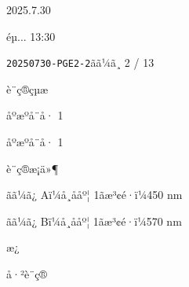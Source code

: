 \documentclass[UTF8,10pt,a4paper,fontset=fandol]{ctexart}
\newcommand{\handwritten}[1]{#1}
\begin{document}
\begin{center}
\begin{center}

\handwritten{2025.7.30}

\handwritten{éµ... 13:30}

\newpage

\noindent\texttt{20250730-PGE2-2}\hfill ãã¼ã¸ 2 / 13

\vspace{0.5em}

\noindent
è¨ç®çµæ

\noindent
\quad åºæºå¨å· 1

\noindent
\quad åºæºå¨å· 1

\noindent
\quad è¨ç®æ¡ä»¶

\noindent
\quad ãã¼ã¿ Aï¼å¸ååº¦ 1ãæ³¢é·ï¼450 nm

\noindent
\quad ãã¼ã¿ Bï¼å¸ååº¦ 1ãæ³¢é·ï¼570 nm

\vspace{0.5em}

\noindent
æ¿

\noindent
å·²è¨ç®

\vspace{0.5em}


\end{center}
\end{center}
\end{document}
